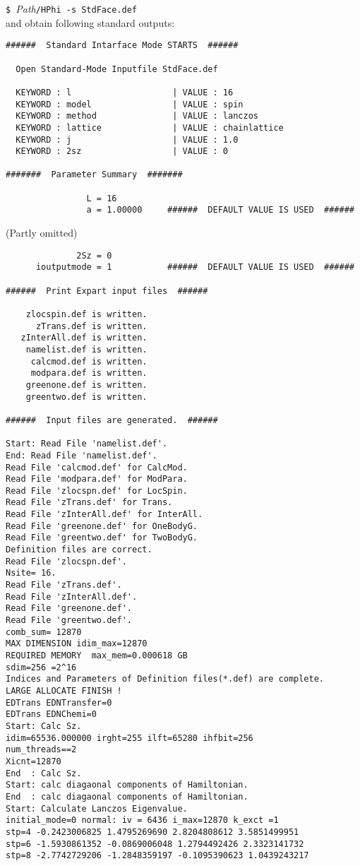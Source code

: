 \hspace{-0.7cm}
\verb|$ |\textit{Path}\verb|/HPhi -s StdFace.def|
\\
and obtain following standard outputs:
\begin{verbatim}
######  Standard Intarface Mode STARTS  ######

  Open Standard-Mode Inputfile StdFace.def 

  KEYWORD : l                    | VALUE : 16 
  KEYWORD : model                | VALUE : spin 
  KEYWORD : method               | VALUE : lanczos 
  KEYWORD : lattice              | VALUE : chainlattice 
  KEYWORD : j                    | VALUE : 1.0 
  KEYWORD : 2sz                  | VALUE : 0 

#######  Parameter Summary  #######

                L = 16 
                a = 1.00000     ######  DEFAULT VALUE IS USED  ######
\end{verbatim}
(Partly omitted)
\begin{verbatim}
              2Sz = 0  
      ioutputmode = 1           ######  DEFAULT VALUE IS USED  ######

######  Print Expart input files  ######

    zlocspin.def is written.
      zTrans.def is written.
   zInterAll.def is written.
    namelist.def is written.
     calcmod.def is written.
     modpara.def is written.
    greenone.def is written.
    greentwo.def is written.

######  Input files are generated.  ######

Start: Read File 'namelist.def'.
End: Read File 'namelist.def'.
Read File 'calcmod.def' for CalcMod.
Read File 'modpara.def' for ModPara.
Read File 'zlocspn.def' for LocSpin.
Read File 'zTrans.def' for Trans.
Read File 'zInterAll.def' for InterAll.
Read File 'greenone.def' for OneBodyG.
Read File 'greentwo.def' for TwoBodyG.
Definition files are correct.
Read File 'zlocspn.def'.
Nsite= 16.
Read File 'zTrans.def'.
Read File 'zInterAll.def'.
Read File 'greenone.def'.
Read File 'greentwo.def'.
comb_sum= 12870 
MAX DIMENSION idim_max=12870 
REQUIRED MEMORY  max_mem=0.000618 GB 
sdim=256 =2^16
Indices and Parameters of Definition files(*.def) are complete.
LARGE ALLOCATE FINISH !
EDTrans EDNTransfer=0 
EDTrans EDNChemi=0 
Start: Calc Sz. 
idim=65536.000000 irght=255 ilft=65280 ihfbit=256 
num_threads==2
Xicnt=12870 
End  : Calc Sz. 
Start: calc diagaonal components of Hamiltonian. 
End  : calc diagaonal components of Hamiltonian. 
Start: Calculate Lanczos Eigenvalue.
initial_mode=0 normal: iv = 6436 i_max=12870 k_exct =1 
stp=4 -0.2423006825 1.4795269690 2.8204808612 3.5851499951 
stp=6 -1.5930861352 -0.0869006048 1.2794492426 2.3323141732 
stp=8 -2.7742729206 -1.2848359197 -0.1095390623 1.0439243217 
\end{verbatim}
